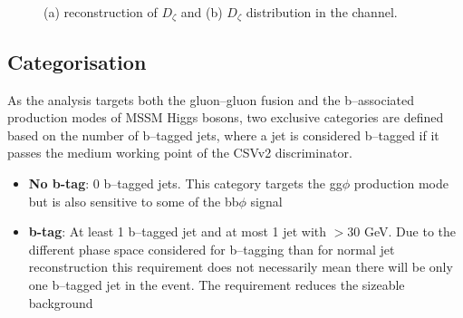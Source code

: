 \begin{figure}[h!]
\begin{center}
\end{center}
\caption{(a) reconstruction of $D_{\zeta}$ \cite{cdf-dzeta} and (b) $D_{\zeta}$ distribution in the 
\emu channel\cite{CMS-PAS-HIG-16-037}.}
\label{fig:mssm_dzeta}
\end{figure}


\subsection{Categorisation}
\label{sec:mssm_eventsel_categories}
As the analysis targets both the gluon--gluon fusion
and the b--associated production modes of MSSM Higgs
bosons, two exclusive categories are defined based on the 
number of b--tagged jets, where a jet is considered b--tagged
if it passes the medium working point of the \ac{CSV}v2 discriminator. 
\begin{itemize}
\setlength{\itemsep}{-\baselineskip}
\item \textbf{No b-tag}: 0 b--tagged jets. This category targets the gg$\phi$ production mode but is also sensitive to some of the bb$\phi$ signal
\item \textbf{b-tag}: At least 1 b--tagged jet and at most 1 
jet with \pT$>30$ GeV. Due to the different phase space considered for
b--tagging than for normal jet reconstruction this requirement does not necessarily
mean there will be only one b--tagged jet in the event. The requirement reduces the sizeable \ttbar
background
\end{itemize}

